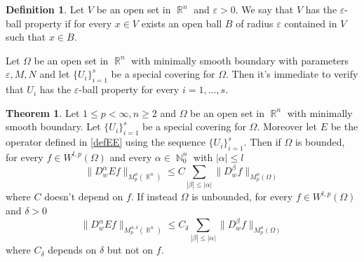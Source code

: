 \documentclass[12pt]{article}
\theoremstyle{definition}
\newtheorem{definition}{Definition}
\newtheorem{theorem}{Theorem}
\DeclareMathOperator\rr{\mathbb{R}}
\DeclareMathOperator\nn{\mathbb{N}}
\begin{document}
\begin{definition}
Let $V$ be an open set in $\rr^n$ and $\varepsilon >0$. We say that $V$  has the $\varepsilon$-ball property if for every $ x\in V $ exists an open ball $B$ of radius $\varepsilon$ contained in $V$ such that $x \in B.$
\end{definition}

Let $\Omega$ be an open set in $\rr^n$ with minimally smooth boundary with parameters $\varepsilon,M,N$ and let $\{ U_i\}_{i=1}^s$ be a special covering for $\Omega.$ Then it's immediate to verify that $U_i$ has the $\varepsilon$-ball property for every $i=1,...,s.$ 
\begin{theorem}

Let $1\le p<\infty,n\ge2$ and $\Omega$ be an open set in $\rr^n$ with minimally smooth boundary. Let $\{ U_i\}_{i=1}^s$ be a special covering for $\Omega.$ Moreover let $E$ be the operator defined in \eqref{defEE} using the sequence $\{ U_i\}_{i=1}^s$. Then if $\Omega$ is bounded, for every $f \in W^{l,p}(\Omega)$ and every $\alpha \in \nn_0^n$ with $|\alpha|\le l$ 
\begin{equation}
 \| D^\alpha_w Ef\|_{M_p^\phi(\rr^n)}\le C\sum_{|\beta|\le |\alpha|}\|D^\beta_w f \|_{M_p^\phi(\Omega)} \label{Ebound1}
 \end{equation}
 where $C$ doesn't depend on $f.$ If instead $\Omega$ is unbounded, for every $f \in W^{l,p}(\Omega)$ and $\delta>0$
\begin{equation}
 \| D^\alpha_w Ef\|_{M_p^{\phi,\delta}(\rr^n)}\le C_\delta\sum_{|\beta|\le |\alpha|}\|D^\beta_w f \|_{M_p^\phi(\Omega)} \label{Ebound2}
 \end{equation}
 where $C_\delta$ depends on $\delta$ but not on $f.$
\end{theorem}
\end{document}
